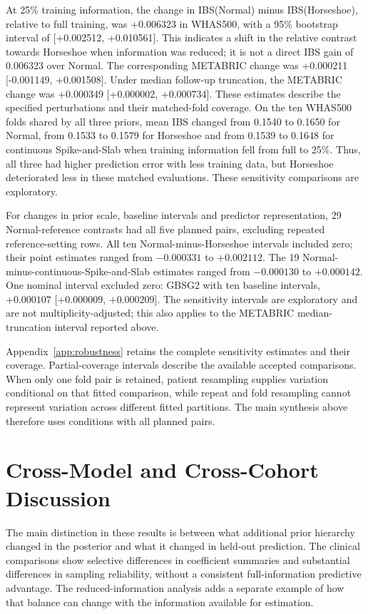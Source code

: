 At 25\% training information, the change in IBS(Normal) minus IBS(Horseshoe), relative to full training, was +0.006323 in WHAS500, with a 95\% bootstrap interval of [+0.002512, +0.010561]. This indicates a shift in the relative contrast towards Horseshoe when information was reduced; it is not a direct IBS gain of 0.006323 over Normal. The corresponding METABRIC change was +0.000211 [-0.001149, +0.001508]. Under median follow-up truncation, the METABRIC change was +0.000349 [+0.000002, +0.000734]. These estimates describe the specified perturbations and their matched-fold coverage. On the ten WHAS500 folds shared by all three priors, mean IBS changed from 0.1540 to 0.1650 for Normal, from 0.1533 to 0.1579 for Horseshoe and from 0.1539 to 0.1648 for continuous Spike-and-Slab when training information fell from full to 25\%. Thus, all three had higher prediction error with less training data, but Horseshoe deteriorated less in these matched evaluations. These sensitivity comparisons are exploratory.

For changes in prior scale, baseline intervals and predictor representation, 29 Normal-reference contrasts had all five planned pairs, excluding repeated reference-setting rows. All ten Normal-minus-Horseshoe intervals included zero; their point estimates ranged from $-0.000331$ to $+0.002112$. The 19 Normal-minus-continuous-Spike-and-Slab estimates ranged from $-0.000130$ to $+0.000142$. One nominal interval excluded zero: GBSG2 with ten baseline intervals, $+0.000107$ [$+0.000009$, $+0.000209$]. The sensitivity intervals are exploratory and are not multiplicity-adjusted; this also applies to the METABRIC median-truncation interval reported above.

Appendix~\ref{app:robustness} retains the complete sensitivity estimates and their coverage. Partial-coverage intervals describe the available accepted comparisons. When only one fold pair is retained, patient resampling supplies variation conditional on that fitted comparison, while repeat and fold resampling cannot represent variation across different fitted partitions. The main synthesis above therefore uses conditions with all planned pairs.

\section{Cross-Model and Cross-Cohort Discussion}\label{cross-model-and-cross-cohort-discussion}

The main distinction in these results is between what additional prior hierarchy changed in the posterior and what it changed in held-out prediction. The clinical comparisons show selective differences in coefficient summaries and substantial differences in sampling reliability, without a consistent full-information predictive advantage. The reduced-information analysis adds a separate example of how that balance can change with the information available for estimation.

